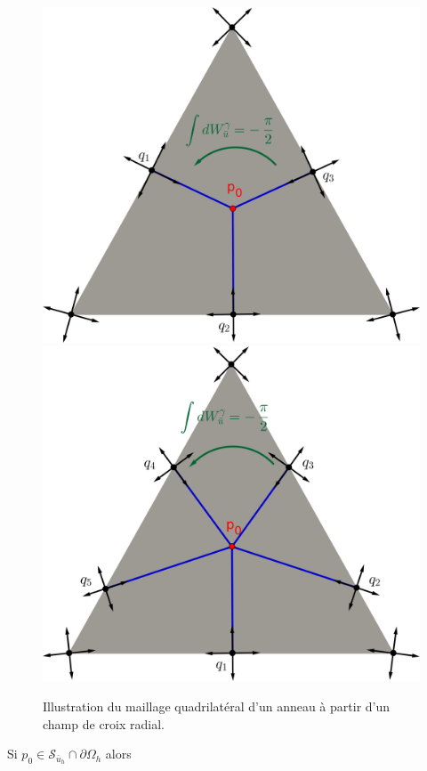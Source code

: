 \begin{itemize}
\begin{figure}[!h]
\centering
\includegraphics[scale=0.755]{images/triangle separatrices 3.png}
\includegraphics[scale=0.755]{images/triangle separatrices 5.png}
\caption{Illustration du maillage quadrilatéral d'un anneau à partir d'un champ de croix radial.}
\label{fig:init_streams_int}
\end{figure}

\end{itemize}
Si $p_0\in\mathcal{S}_{\bar{u}_h}\cap\partial\Omega_h$ alors

